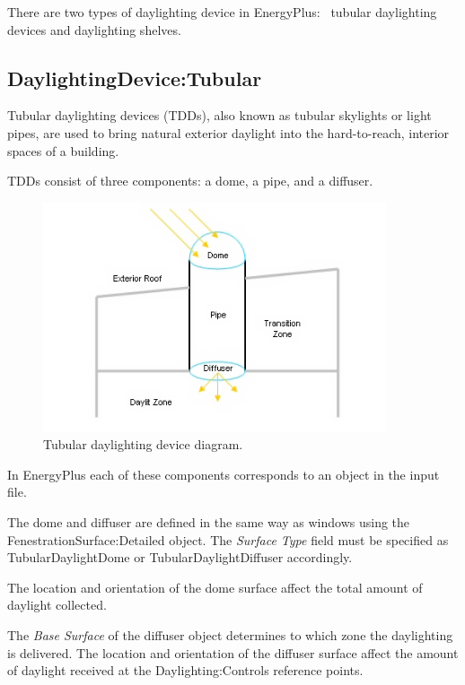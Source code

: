 There are two types of daylighting device in EnergyPlus:~ tubular daylighting devices and daylighting shelves.

\subsection{DaylightingDevice:Tubular}\label{daylightingdevicetubular}

Tubular daylighting devices (TDDs), also known as tubular skylights or light pipes, are used to bring natural exterior daylight into the hard-to-reach, interior spaces of a building.

TDDs consist of three components: a dome, a pipe, and a diffuser.

\begin{figure}[hbtp] %
\centering
\includegraphics[width=0.9\textwidth, height=0.9\textheight, keepaspectratio=true]{media/image108.png}
\caption{Tubular daylighting device diagram. \protect \label{fig:tubular-daylighting-device-diagram.}}
\end{figure}

In EnergyPlus each of these components corresponds to an object in the input file.

The dome and diffuser are defined in the same way as windows using the FenestrationSurface:Detailed object. The \emph{Surface Type} field must be specified as TubularDaylightDome or TubularDaylightDiffuser accordingly.

The location and orientation of the dome surface affect the total amount of daylight collected.

The \emph{Base Surface} of the diffuser object determines to which zone the daylighting is delivered. The location and orientation of the diffuser surface affect the amount of daylight received at the Daylighting:Controls reference points.

